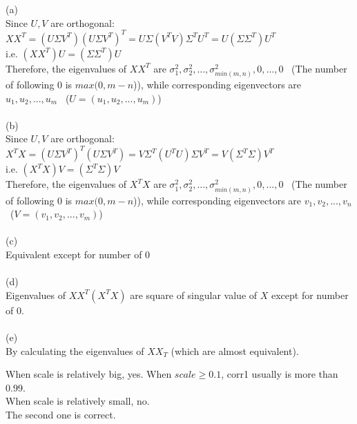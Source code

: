 \documentclass[12pt,letterpaper,fleqn]{hmcpset}
\begin{document}
\begin{problem}[05-PCA.1]
\end{problem}
\begin{solution}
(a)
\\Since $U,V$ are orthogonal:
\\$XX^T=(U\Sigma V^T)(U\Sigma V^T)^T=U\Sigma(V^TV)\Sigma^TU^T=U(\Sigma\Sigma^T)U^T$
\\i.e. $(XX^T)U=(\Sigma\Sigma^T)U$
\\Therefore, the eigenvalues of $XX^T$ are $\sigma_1^2,\sigma_2^2,...,\sigma_{min(m,n)}^2,0,...,0$ \ (The number of following 0 is $max(0, m-n$)), while corresponding eigenvectors are $u_1,u_2,...,u_m$  \ ($U=(u_1,u_2,...,u_m)$)
\\\\(b)
\\Since $U,V$ are orthogonal:
\\$X^TX=(U\Sigma V^T)^T(U\Sigma V^T)=V\Sigma^T(U^TU)\Sigma V^T=V(\Sigma^T\Sigma)V^T$
\\i.e. $(X^TX)V=(\Sigma^T\Sigma)V$
\\Therefore, the eigenvalues of $X^TX$ are $\sigma_1^2,\sigma_2^2,...,\sigma_{min(m,n)}^2,0,...,0$ \ (The number of following 0 is $max(0, m-n$)), while corresponding eigenvectors are $v_1,v_2,...,v_n$  \ ($V=(v_1,v_2,...,v_m)$)
\\\\(c)
\\Equivalent except for number of 0
\\\\(d)
\\Eigenvalues of $XX^T(X^TX)$ are square of singular value of $X$ except for number of 0.
\\\\(e)
\\By calculating the eigenvalues of $XX_T$ (which are almost equivalent).
\end{solution}

\begin{problem}[05-PCA.2]
\end{problem}
\begin{solution}
When scale is relatively big, yes. When $scale\ge 0.1$, corr1 usually is more than 0.99.
\\When scale is relatively small, no.	
\\The second one is correct.
\end{solution}
\end{document}

